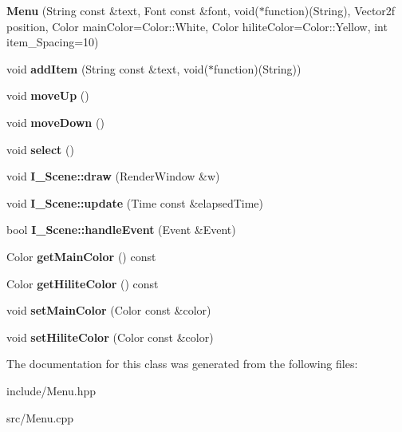\begin{DoxyCompactItemize}
\item 
\hypertarget{class_menu_ab17b491c89e3304a391389f69ada23d9}{}{\bfseries Menu} (String const \&text, Font const \&font, void($\ast$function)(String), Vector2f position, Color main\+Color=Color\+::\+White, Color hilite\+Color=Color\+::\+Yellow, int item\+\_\+\+Spacing=10)\label{class_menu_ab17b491c89e3304a391389f69ada23d9}

\item 
\hypertarget{class_menu_a962905f6aefd627fd721575376e81074}{}void {\bfseries add\+Item} (String const \&text, void($\ast$function)(String))\label{class_menu_a962905f6aefd627fd721575376e81074}

\item 
\hypertarget{class_menu_abfa1619b1d868d85b3978f5918c2a56f}{}void {\bfseries move\+Up} ()\label{class_menu_abfa1619b1d868d85b3978f5918c2a56f}

\item 
\hypertarget{class_menu_abbec620bd41608fba287400ead4467aa}{}void {\bfseries move\+Down} ()\label{class_menu_abbec620bd41608fba287400ead4467aa}

\item 
\hypertarget{class_menu_a06aa310db0ce0373a6b5fed1be8cd500}{}void {\bfseries select} ()\label{class_menu_a06aa310db0ce0373a6b5fed1be8cd500}

\item 
\hypertarget{class_menu_a35702c447a8bec6e86fca452b624b4fa}{}void {\bfseries I\+\_\+\+Scene\+::draw} (Render\+Window \&w)\label{class_menu_a35702c447a8bec6e86fca452b624b4fa}

\item 
\hypertarget{class_menu_aff674a08633ef647a384a3430edc5486}{}void {\bfseries I\+\_\+\+Scene\+::update} (Time const \&elapsed\+Time)\label{class_menu_aff674a08633ef647a384a3430edc5486}

\item 
\hypertarget{class_menu_a01460092729dec58f41eb8a7331ed2ea}{}bool {\bfseries I\+\_\+\+Scene\+::handle\+Event} (Event \&Event)\label{class_menu_a01460092729dec58f41eb8a7331ed2ea}

\item 
\hypertarget{class_menu_a6d890ad63863ad899e035eaaed2d3b7f}{}Color {\bfseries get\+Main\+Color} () const \label{class_menu_a6d890ad63863ad899e035eaaed2d3b7f}

\item 
\hypertarget{class_menu_a9d1160079da5700ac1acf51038dfdb9c}{}Color {\bfseries get\+Hilite\+Color} () const \label{class_menu_a9d1160079da5700ac1acf51038dfdb9c}

\item 
\hypertarget{class_menu_a296ef1e0dbc603ce8f6b379f7f0513c3}{}void {\bfseries set\+Main\+Color} (Color const \&color)\label{class_menu_a296ef1e0dbc603ce8f6b379f7f0513c3}

\item 
\hypertarget{class_menu_a05c6c0797fcc9e0ac4e237f90d4c1dad}{}void {\bfseries set\+Hilite\+Color} (Color const \&color)\label{class_menu_a05c6c0797fcc9e0ac4e237f90d4c1dad}

\end{DoxyCompactItemize}


The documentation for this class was generated from the following files\+:\begin{DoxyCompactItemize}
\item 
include/Menu.\+hpp\item 
src/Menu.\+cpp\end{DoxyCompactItemize}

